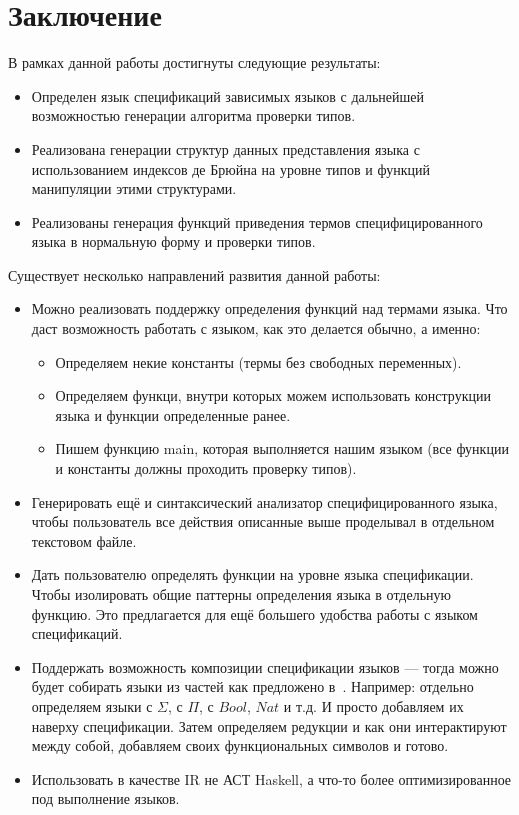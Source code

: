 \documentclass{spbau-diploma}
\begin{document}





\section*{Заключение}

В рамках данной работы достигнуты следующие результаты:
\begin{itemize}
  \item Определен язык спецификаций зависимых языков с дальнейшей возможностью генерации алгоритма проверки типов.
  \item Реализована генерации структур данных представления языка с использованием индексов де Брюйна на уровне типов и функций манипуляции этими структурами.
  \item Реализованы генерация функций приведения термов специфицированного языка в нормальную форму и проверки типов.
\end{itemize}

Существует несколько направлений развития данной работы:
\begin{itemize}
  \item Можно реализовать поддержку определения функций над термами языка. Что даст возможность работать с языком, как это делается обычно, а именно:
  \begin{itemize}
    \item Определяем некие константы (термы без свободных переменных).
    \item Определяем функци, внутри которых можем использовать конструкции языка и функции определенные ранее.
    \item Пишем функцию main, которая выполняется нашим языком (все функции и константы должны проходить проверку типов).
  \end{itemize}
  \item Генерировать ещё и синтаксический анализатор специфицированного языка, чтобы пользователь все действия описанные выше проделывал в отдельном текстовом файле.
  \item Дать пользователю определять функции на уровне языка спецификации. Чтобы изолировать общие паттерны определения языка в отдельную функцию. Это предлагается для ещё большего удобства работы с языком спецификаций.
  \item Поддержать возможность композиции спецификации языков --- тогда можно будет собирать языки из частей как предложено в~\cite{isaev}. Например: отдельно определяем языки с $\Sigma$, с $\Pi$, с $Bool$, $Nat$ и т.д. И просто добавляем их наверху спецификации. Затем определяем редукции и как они интерактируют между собой, добавляем своих функциональных символов и готово.
  \item Использовать в качестве IR\cite{IR} не АСТ Haskell, а что-то более оптимизированное под выполнение языков.
\end{itemize}






\end{document}
